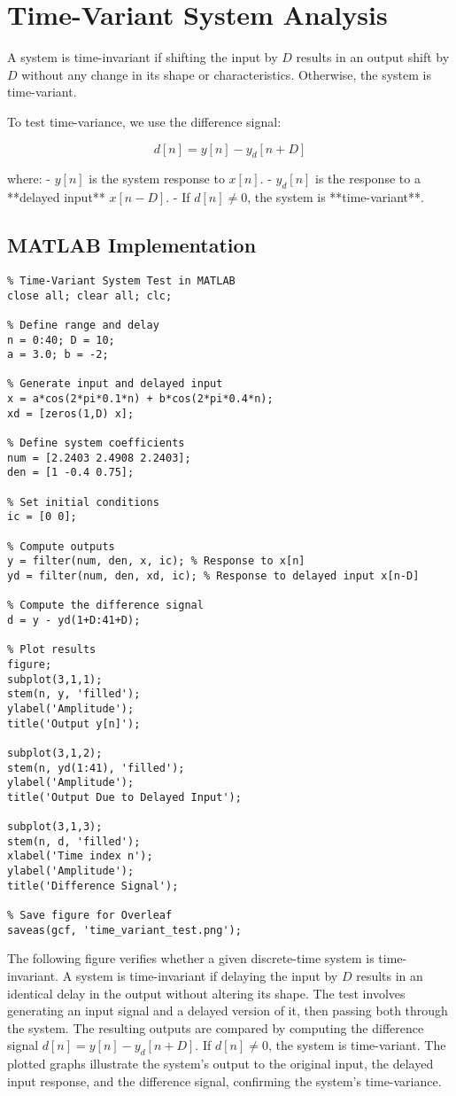 \documentclass[a4paper,12pt]{article}
\begin{document}
\section{Time-Variant System Analysis}
A system is time-invariant if shifting the input by \( D \) results in an output shift by \( D \) without any change in its shape or characteristics. Otherwise, the system is time-variant.

To test time-variance, we use the difference signal:

\[
d[n] = y[n] - y_d[n + D]
\]

where:
- \( y[n] \) is the system response to \( x[n] \).
- \( y_d[n] \) is the response to a **delayed input** \( x[n - D] \).
- If \( d[n] \neq 0 \), the system is **time-variant**.

\subsection{MATLAB Implementation}
\begin{verbatim}
% Time-Variant System Test in MATLAB
close all; clear all; clc;

% Define range and delay
n = 0:40; D = 10;
a = 3.0; b = -2;

% Generate input and delayed input
x = a*cos(2*pi*0.1*n) + b*cos(2*pi*0.4*n);
xd = [zeros(1,D) x];

% Define system coefficients
num = [2.2403 2.4908 2.2403]; 
den = [1 -0.4 0.75];

% Set initial conditions
ic = [0 0];

% Compute outputs
y = filter(num, den, x, ic); % Response to x[n]
yd = filter(num, den, xd, ic); % Response to delayed input x[n-D]

% Compute the difference signal
d = y - yd(1+D:41+D);

% Plot results
figure;
subplot(3,1,1);
stem(n, y, 'filled');
ylabel('Amplitude');
title('Output y[n]');

subplot(3,1,2);
stem(n, yd(1:41), 'filled');
ylabel('Amplitude');
title('Output Due to Delayed Input');

subplot(3,1,3);
stem(n, d, 'filled');
xlabel('Time index n');
ylabel('Amplitude');
title('Difference Signal');

% Save figure for Overleaf
saveas(gcf, 'time_variant_test.png');
\end{verbatim}
The following figure verifies whether a given discrete-time system is time-invariant. A system is time-invariant if delaying the input by \( D \) results in an identical delay in the output without altering its shape. The test involves generating an input signal and a delayed version of it, then passing both through the system. The resulting outputs are compared by computing the difference signal \( d[n] = y[n] - y_d[n + D] \). If \( d[n] \neq 0 \), the system is time-variant. The plotted graphs illustrate the system's output to the original input, the delayed input response, and the difference signal, confirming the system's time-variance.
\end{document}
